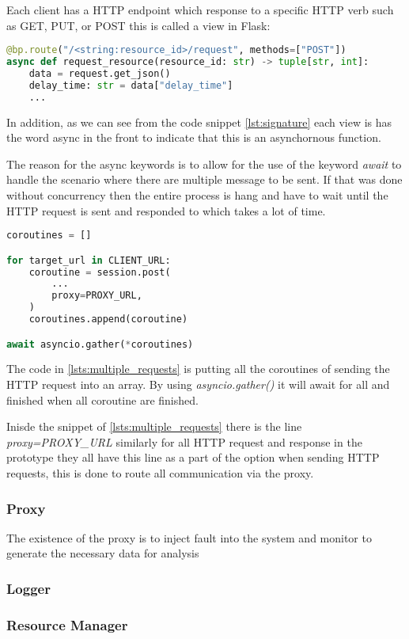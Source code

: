 Each client has a HTTP endpoint which response to a specific HTTP verb such as
GET, PUT, or POST this is called a view in Flask:

\begin{lstlisting}[language=Python, label={lst:signature}, caption={function signature of a client}]
@bp.route("/<string:resource_id>/request", methods=["POST"])
async def request_resource(resource_id: str) -> tuple[str, int]:
    data = request.get_json()
    delay_time: str = data["delay_time"]
    ...
\end{lstlisting}

In addition, as we can see from the code snippet \ref{lst:signature}  each view is has the word 
async in the front to indicate that this is an asynchornous function. 

The reason for the async keywords is to allow for the use of the keyword 
\textit{await} to handle the scenario where there are multiple message to be 
sent. If that was done without concurrency then the entire process is hang 
and have to wait until the HTTP request is sent and responded to which takes a 
lot of time.


\begin{lstlisting}[language=Python, label={lsts:multiple_requests}, caption={Multiple requests being sent simultaneously}]
coroutines = []

for target_url in CLIENT_URL:
    coroutine = session.post(
        ...
        proxy=PROXY_URL,
    )
    coroutines.append(coroutine)

await asyncio.gather(*coroutines)
\end{lstlisting}

The code in \ref{lsts:multiple_requests} is putting all the coroutines of sending the HTTP request into 
an array. By using \textit{asyncio.gather()} it will await for all and finished
when all coroutine are finished.

Inisde the snippet of \ref{lsts:multiple_requests} there is the line 
\textit{proxy=PROXY\_URL}
similarly for all HTTP request and response in the prototype they all have this line 
as a part of the option when sending HTTP requests, this is done to route all 
communication via the proxy.

\subsubsection{Proxy}

The existence of the proxy is to inject fault into the system and monitor to 
generate the necessary data for analysis


\subsubsection{Logger}

\subsubsection{Resource Manager}

